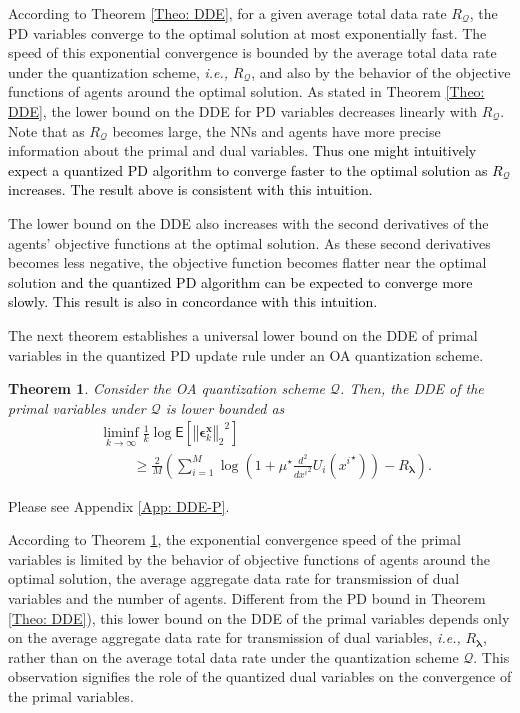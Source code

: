\documentclass[10pt,twocolumn,twoside]{IEEEtran}
\newtheorem{theorem}{Theorem}
\begin{document}
According to Theorem \ref{Theo: DDE}, for a given average total data rate $R_{\mathcal{Q}}$, the PD variables  converge to the optimal solution at most exponentially fast.
The speed of this exponential convergence is bounded by the average total data rate under the quantization scheme, \emph{i.e.,} $R_{\mathcal{Q}}$, 
and also by the behavior of the objective functions of agents around the optimal solution. As stated in Theorem \ref{Theo: DDE}, the lower bound on the DDE for PD variables decreases linearly with $R_{\mathcal{Q}}$.
Note that as $R_{\mathcal{Q}}$ becomes large, the NNs and agents have more precise information about the primal and dual variables. \textcolor{black}{Thus one might intuitively expect a  quantized PD algorithm to converge faster 
to the optimal solution as $R_{\mathcal{Q}}$ increases. The result above is consistent with this intuition.}

The lower bound on the DDE also increases with the second derivatives of the agents' objective functions  at the optimal solution. 
As these second derivatives becomes less negative, 
the objective function becomes flatter near the optimal solution \textcolor{black}{and the quantized PD algorithm can be expected to converge more slowly. This result is also in concordance with this intuition.}

The next theorem establishes a universal lower bound on the DDE of primal variables in the quantized PD update rule under an OA quantization scheme.
\begin{theorem}\label{Theo: DDE-P}
Consider the OA quantization scheme $\mathcal{Q}$. Then, the DDE of the primal variables under $\mathcal{Q}$ is lower bounded as
\begin{align}
&\liminf_{k\rightarrow\infty}\frac{1}{k}\log{\ensuremath{\mathsf{E}\left[{{\left\Vert{{\ensuremath{\boldsymbol{{\epsilon}}}}^{{\ensuremath{\boldsymbol{{x}}}}}_k}\right\Vert_{{2}}}^2} \right]}}\nonumber\\
&\hspace{1cm}\geq\frac{2}{M}{\left({\sum_{i=1}^M\log{\left({1+\mu^\star \frac{d^2}{d {x^i}^2}U_i{\left({{x^i}^\star}\right)}}\right)}-R_{{\ensuremath{\boldsymbol{{\lambda}}}}}}\right)}.
\end{align}
\end{theorem}
\begin{IEEEproof}
Please see Appendix \ref{App: DDE-P}.
\end{IEEEproof}
According to Theorem \ref{Theo: DDE-P},  the  exponential convergence speed of the primal variables is limited by the behavior of objective functions of agents around the optimal solution, the average aggregate data rate for transmission of dual variables and the number of agents. Different from the PD bound in Theorem \ref{Theo: DDE}), this  lower bound on the DDE of the primal variables depends only on the average aggregate data rate for transmission of dual variables, \emph{i.e.,} $R_{{\ensuremath{\boldsymbol{{\lambda}}}}}$, rather than on the average total data rate under the quantization scheme $\mathcal{Q}$. This observation signifies the role of the quantized dual variables on the convergence of the primal variables. 
\end{document}

